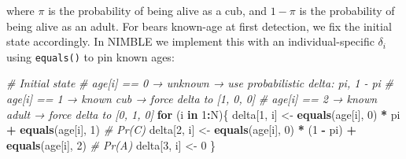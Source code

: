 \documentclass[
  12pt,
]{krantz}
\newenvironment{Shaded}{\begin{snugshade}}{\end{snugshade}}
\newcommand{\CommentTok}[1]{\textcolor[rgb]{0.56,0.35,0.01}{\textit{#1}}}
\newcommand{\ControlFlowTok}[1]{\textcolor[rgb]{0.13,0.29,0.53}{\textbf{#1}}}
\newcommand{\DecValTok}[1]{\textcolor[rgb]{0.00,0.00,0.81}{#1}}
\newcommand{\FunctionTok}[1]{\textcolor[rgb]{0.13,0.29,0.53}{\textbf{#1}}}
\newcommand{\NormalTok}[1]{#1}
\newcommand{\OtherTok}[1]{\textcolor[rgb]{0.56,0.35,0.01}{#1}}
\newcommand{\SpecialCharTok}[1]{\textcolor[rgb]{0.81,0.36,0.00}{\textbf{#1}}}
\begin{document}
where \(\pi\) is the probability of being alive as a cub, and \(1 - \pi\) is the probability of being alive as an adult. For bears known-age at first detection, we fix the initial state accordingly. In NIMBLE we implement this with an individual-specific \(\delta_i\) using \texttt{equals()} to pin known ages:

\begin{Shaded}
\begin{Highlighting}[]
\CommentTok{\# Initial state}
\CommentTok{\# age[i] == 0 → unknown → use probabilistic delta: pi, 1 {-} pi}
\CommentTok{\# age[i] == 1 → known cub → force delta to [1, 0, 0]}
\CommentTok{\# age[i] == 2 → known adult → force delta to [0, 1, 0]}
\ControlFlowTok{for}\NormalTok{ (i }\ControlFlowTok{in} \DecValTok{1}\SpecialCharTok{:}\NormalTok{N)\{}
\NormalTok{  delta[}\DecValTok{1}\NormalTok{, i] }\OtherTok{\textless{}{-}} \FunctionTok{equals}\NormalTok{(age[i], }\DecValTok{0}\NormalTok{) }\SpecialCharTok{*}\NormalTok{ pi }\SpecialCharTok{+} \FunctionTok{equals}\NormalTok{(age[i], }\DecValTok{1}\NormalTok{)  }\CommentTok{\# Pr(C)}
\NormalTok{  delta[}\DecValTok{2}\NormalTok{, i] }\OtherTok{\textless{}{-}} \FunctionTok{equals}\NormalTok{(age[i], }\DecValTok{0}\NormalTok{) }\SpecialCharTok{*}\NormalTok{ (}\DecValTok{1} \SpecialCharTok{{-}}\NormalTok{ pi) }\SpecialCharTok{+} \FunctionTok{equals}\NormalTok{(age[i], }\DecValTok{2}\NormalTok{)  }\CommentTok{\# Pr(A)}
\NormalTok{  delta[}\DecValTok{3}\NormalTok{, i] }\OtherTok{\textless{}{-}} \DecValTok{0}
\NormalTok{\}}
\end{Highlighting}
\end{Shaded}
\end{document}
